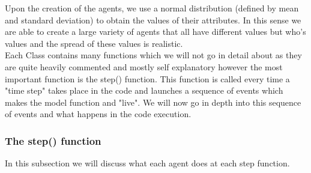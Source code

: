 \noindent Upon the creation of the agents, we use a normal distribution (defined by mean and standard deviation) to obtain the values of their attributes. In this sense we are able to create a large variety of agents that all have different values but who's values and the spread of these values is realistic.\\

\noindent Each Class contains many functions which we will not go in detail about as they are quite heavily commented and mostly self explanatory however the most important function is the step() function. This function is called every time a "time step" takes place in the code and launches a sequence of events which makes the model function and "live". We will now go in depth into this sequence of events and what happens in the code execution.
\newpage

\subsubsection{The step() function}

In this subsection we will discuss what each agent does at each step function.
\newline

